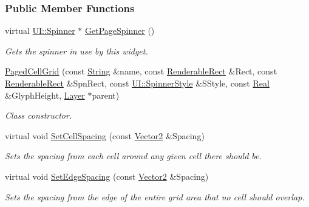 \subsubsection*{Public Member Functions}
\begin{DoxyCompactItemize}
\item 
virtual \hyperlink{classMezzanine_1_1UI_1_1Spinner}{UI::Spinner} $\ast$ \hyperlink{classMezzanine_1_1UI_1_1PagedCellGrid_a0478eb61f08e9bdea6a239175b52b0dc}{GetPageSpinner} ()
\begin{DoxyCompactList}\small\item\em Gets the spinner in use by this widget. \item\end{DoxyCompactList}\item 
\hyperlink{classMezzanine_1_1UI_1_1PagedCellGrid_ac30a2ae0f11685a54682c5ee00a0c36e}{PagedCellGrid} (const \hyperlink{namespaceMezzanine_acf9fcc130e6ebf08e3d8491aebcf1c86}{String} \&name, const \hyperlink{structMezzanine_1_1UI_1_1RenderableRect}{RenderableRect} \&Rect, const \hyperlink{structMezzanine_1_1UI_1_1RenderableRect}{RenderableRect} \&SpnRect, const \hyperlink{namespaceMezzanine_1_1UI_a62462d4df783dcdda77e1590a96bc6d6}{UI::SpinnerStyle} \&SStyle, const \hyperlink{namespaceMezzanine_a726731b1a7df72bf3583e4a97282c6f6}{Real} \&GlyphHeight, \hyperlink{classMezzanine_1_1UI_1_1Layer}{Layer} $\ast$parent)
\begin{DoxyCompactList}\small\item\em Class constructor. \item\end{DoxyCompactList}\item 
virtual void \hyperlink{classMezzanine_1_1UI_1_1PagedCellGrid_aadf28fcff9f6ebab1ab86ecbbdb73159}{SetCellSpacing} (const \hyperlink{classMezzanine_1_1Vector2}{Vector2} \&Spacing)
\begin{DoxyCompactList}\small\item\em Sets the spacing from each cell around any given cell there should be. \item\end{DoxyCompactList}\item 
virtual void \hyperlink{classMezzanine_1_1UI_1_1PagedCellGrid_a79b32a3ab8f2df66be181730710e76ae}{SetEdgeSpacing} (const \hyperlink{classMezzanine_1_1Vector2}{Vector2} \&Spacing)
\begin{DoxyCompactList}\small\item\em Sets the spacing from the edge of the entire grid area that no cell should overlap. \item\end{DoxyCompactList}\item 

\end{DoxyCompactItemize}
